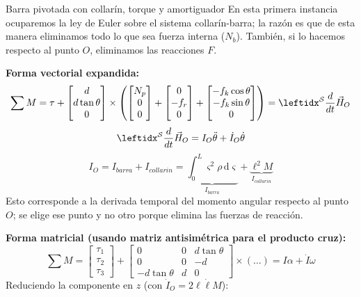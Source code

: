 \begin{solucion}{Barra pivotada con collarín, torque y amortiguador}
En esta primera instancia ocuparemos la ley de Euler sobre el sistema collarín-barra; la razón es que de esta manera eliminamos todo lo que sea fuerza interna ($N_b$). También, si lo hacemos respecto al punto $O$, eliminamos las reacciones $F$.

\textbf{Forma vectorial expandida:}
$$
\sum M = \tau + \begin{bmatrix} d \\ d \tan \theta \\ 0 \end{bmatrix} \times \left( \begin{bmatrix} N_p \\ 0 \\ 0 \end{bmatrix} + \begin{bmatrix} 0 \\ -f_r \\ 0 \end{bmatrix} + \begin{bmatrix} -f_k \cos \theta \\ -f_k \sin \theta \\ 0 \end{bmatrix} \right) = \der{\vec{H}_O}{S}{}
$$
$$\der{\vec{H}_O}{S}{}=I_O\ddot \theta + \dot I_O \dot\theta$$
$$I_O=I_{barra}+I_{collarin}=\underbrace{\int_0^L\varsigma^2\rho \,\text{d}\varsigma}_{I_{barra}} +\underbrace{\ell^2M}_{I_{collarin}}$$
Esto corresponde a la derivada temporal del momento angular respecto al punto $O$; se elige ese punto y no otro porque elimina las fuerzas de reacción.

\textbf{Forma matricial (usando matriz antisimétrica para el producto cruz):}
$$
\sum M = \begin{bmatrix} \tau_1 \\ \tau_2 \\ \tau_3 \end{bmatrix} + \begin{bmatrix} 0 & 0 & d \tan \theta \\ 0 & 0 & -d \\ -d \tan \theta & d & 0 \end{bmatrix} \times \left( \dots \right) = I \alpha + \dot{I} \omega
$$
Reduciendo la componente en $z$ (con $\dot I_O=2\ell\dot\ell M$):


\end{solucion}
